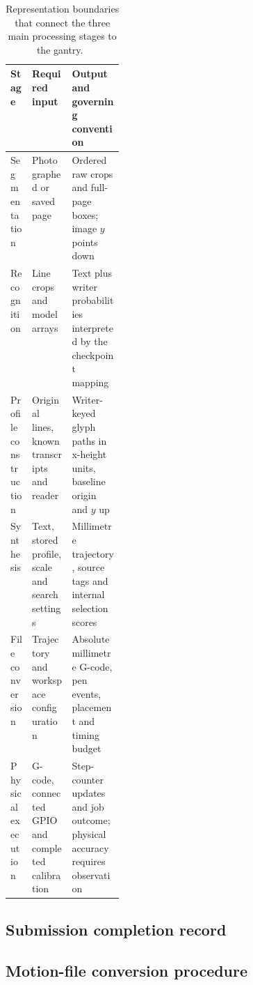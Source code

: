 \begin{table}[!htbp]\centering\small
\begin{tabularx}{\linewidth}{|p{0.19\linewidth}|X|X|}
\hline\textbf{Stage}&\textbf{Required input}&\textbf{Output and governing convention}\\\hline
Segmentation&Photographed or saved page&Ordered raw crops and full-page boxes; image $y$ points down\\\hline
Recognition&Line crops and model arrays&Text plus writer probabilities interpreted by the checkpoint mapping\\\hline
Profile construction&Original lines, known transcripts and reader&Writer-keyed glyph paths in x-height units, baseline origin and $y$ up\\\hline
Synthesis&Text, stored profile, scale and search settings&Millimetre trajectory, source tags and internal selection scores\\\hline
File conversion&Trajectory and workspace configuration&Absolute millimetre G-code, pen events, placement and timing budget\\\hline
Physical execution&G-code, connected GPIO and completed calibration&Step-counter updates and job outcome; physical accuracy requires observation\\\hline
\end{tabularx}
\caption{Representation boundaries that connect the three main processing stages to the gantry.~\cite{brauneevidence2026,braunepipeline2026}}
\label{tab:des-contracts}
\end{table}

\FloatBarrier
\subsection{Submission completion record}
\FloatBarrier

\subsection{Motion-file conversion procedure}\label{app:des-machine-procedure}

